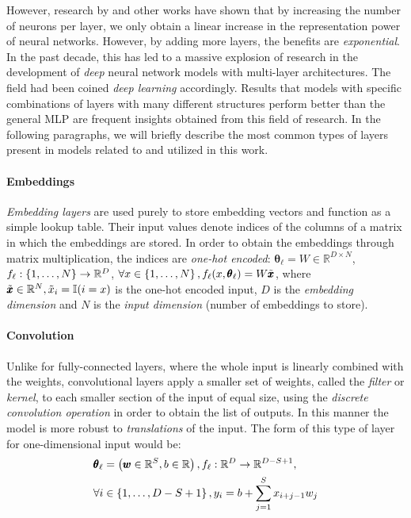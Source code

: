 However, research by \cite{telgarsky_representation_2015, telgarsky_benefits_2016} and other works have shown that by increasing the number of neurons per layer, we only obtain a linear increase in the representation power of neural networks. However, by adding more layers, the benefits are \emph{exponential}. In the past decade, this has led to a massive explosion of research in the development of \emph{deep} neural network models with multi-layer architectures. The field had been coined \emph{deep learning} accordingly. Results that models with specific combinations of layers with many different structures perform better than the general MLP are frequent insights obtained from this field of research. In the following paragraphs, we will briefly describe the most common types of layers present in models related to and utilized in this work.

\paragraph{Embeddings} \emph{Embedding layers} are used purely to store embedding vectors and function as a simple lookup table. Their input values denote indices of the columns of a matrix in which the embeddings are stored. In order to obtain the embeddings through matrix multiplication, the indices are \emph{one-hot encoded}: $\pmb{\theta}_{\ell} = W \in \mathbb{R}^{D \times N}$, $f_{\ell}: \mathopen{}\left\{1,\dots,N\right\} \to \mathbb{R}^D$, $\forall x \in \mathopen{}\left\{1,\dots,N\right\}, f_{\ell}\mathopen{}\left(x, \pmb{\theta}_{\ell}\right) = W \tilde{\pmb{x}}$, where $\tilde{\pmb{x}} \in \mathbb{R}^N, \tilde{x}_i = \mathbb{I}\mathopen{}\left(i = x\right)$ is the one-hot encoded input, $D$ is the \emph{embedding dimension} and $N$ is the \emph{input dimension} (number of embeddings to store).

\paragraph{Convolution} Unlike for fully-connected layers, where the whole input is linearly combined with the weights, convolutional layers apply a smaller set of weights, called the \emph{filter} or \emph{kernel}, to each smaller section of the input of equal size, using the \emph{discrete convolution operation} in order to obtain the list of outputs. In this manner the model is more robust to \emph{translations} of the input. The form of this type of layer for one-dimensional input would be: 
\begin{align}
\pmb{\theta}_{\ell} &= \mathopen{}\left(\pmb{w} \in \mathbb{R}^{S}, b \in \mathbb{R}\right), f_{\ell}: \mathbb{R}^{D} \to \mathbb{R}^{D-S+1}, \nonumber \\
\forall i &\in \mathopen{}\left\{1,\dots,D-S+1\right\}, y_i = b + \sum_{j=1}^{S}{x_{i+j-1}w_j}    
\end{align}


